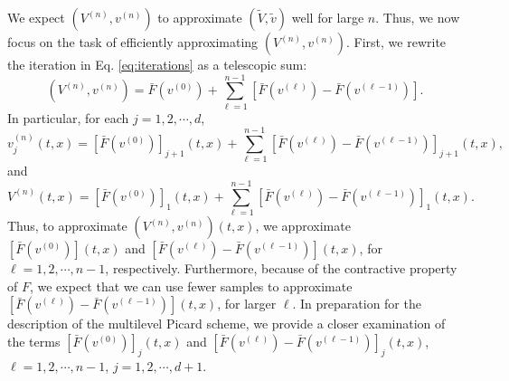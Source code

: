 \documentclass[11pt]{article}
\theoremstyle{definition}
\theoremstyle{plain}
\begin{document}
We expect $(V^{(n)}, v^{(n)})$ to approximate $(\tilde V, \tilde v)$ well for large $n$. 
Thus, we now focus on the task of efficiently approximating $(V^{(n)}, v^{(n)})$. 
First, we rewrite the iteration in Eq. \eqref{eq:iterations} as a telescopic sum:
\begin{equation}
(V^{(n)}, v^{(n)}) = \bar F\left(v^{(0)}\right)+\sum_{\ell=1}^{n-1} \left[\bar F\left(v^{(\ell)}\right) -  \bar F\left(v^{(\ell-1)}\right)\right].
\end{equation}
In particular, for each $j = 1, 2, \cdots, d$, 
\begin{equation}
v^{(n)}_j(t,x) = \left[\bar F\left(v^{(0)}\right)\right]_{j+1} (t,x)+\sum_{\ell=1}^{n-1} \left[\bar F\left(v^{(\ell)}\right) -  \bar F\left(v^{(\ell-1)}\right)\right]_{j+1} (t,x),
\end{equation}
and 
\begin{equation}
V^{(n)}(t,x) = \left[\bar F\left(v^{(0)}\right)\right]_1 (t,x)+\sum_{\ell=1}^{n-1} \left[\bar F\left(v^{(\ell)}\right) -  \bar F\left(v^{(\ell-1)}\right)\right]_1 (t,x).
\end{equation}
Thus, to approximate $(V^{(n)}, v^{(n)})(t,x)$, we approximate $\left[\bar F\left(v^{(0)}\right)\right](t,x)$ and 
$\left[\bar F\left(v^{(\ell)}\right) -  \bar F\left(v^{(\ell-1)}\right)\right](t,x)$, for $\ell = 1, 2, \cdots, n-1$, respectively. 
Furthermore, because of the contractive property of $F$, we expect that we can use fewer samples 
to approximate $\left[\bar F\left(v^{(\ell)}\right) - \bar F\left(v^{(\ell-1)}\right)\right](t,x)$, for larger $\ell$. 
In preparation for the description of the multilevel Picard scheme, we provide a closer examination of the terms 
$\left[\bar F\left(v^{(0)}\right)\right]_j (t,x)$ and $\left[\bar F\left(v^{(\ell)}\right) -  \bar F\left(v^{(\ell-1)}\right)\right]_j (t,x)$, $\ell=1,2,\cdots,n-1$, 
$j = 1, 2, \cdots, d+1$.
\end{document}
